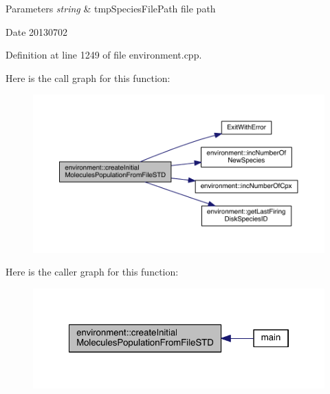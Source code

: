 \begin{DoxyParams}{Parameters}
{\em string} & tmp\-Species\-File\-Path file path \\
\hline
\end{DoxyParams}
\begin{DoxyDate}{Date}
20130702 
\end{DoxyDate}


Definition at line 1249 of file environment.\-cpp.



Here is the call graph for this function\-:\nopagebreak
\begin{figure}[H]
\begin{center}
\leavevmode
\includegraphics[width=350pt]{a00014_aee77384e63261db28ef5677844bdbaf6_cgraph}
\end{center}
\end{figure}




Here is the caller graph for this function\-:\nopagebreak
\begin{figure}[H]
\begin{center}
\leavevmode
\includegraphics[width=322pt]{a00014_aee77384e63261db28ef5677844bdbaf6_icgraph}
\end{center}
\end{figure}


